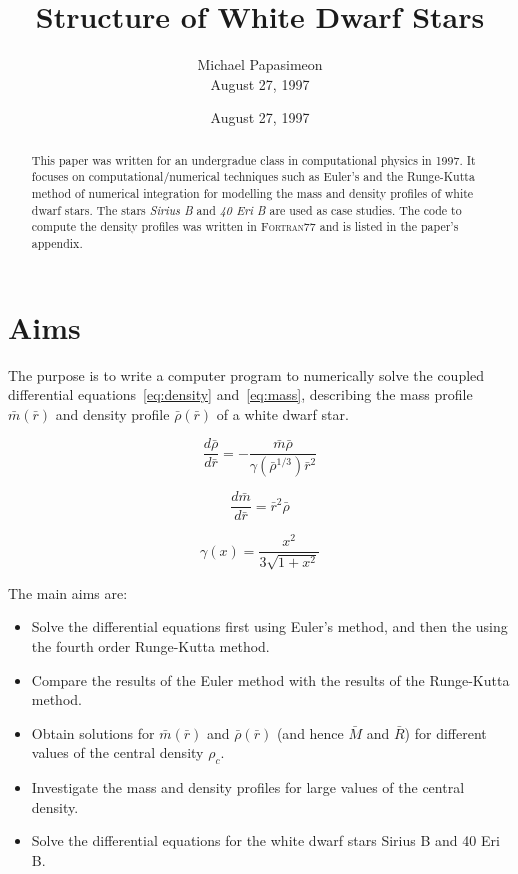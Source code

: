 \documentclass[a4paper]{IEEEtran}
\title{Structure of White Dwarf Stars}
\author{Michael Papasimeon\\ August 27, 1997}
\date{August 27, 1997}
\newcommand{\R}{\bar{r}}
\newcommand{\M}{\bar{m}}
\newcommand{\Rho}{\bar{\rho}}
\begin{document}
\maketitle

\begin{abstract}
This paper was written for an undergradue class in computational physics in 1997. 
It focuses on computational/numerical techniques such as Euler's and the Runge-Kutta 
method of numerical integration for modelling the mass and density profiles of white 
dwarf stars. The stars \emph{Sirius B} and \emph{40 Eri B} are used as case studies. 
The code to compute the density profiles was written in \textsc{Fortran77} and is listed 
in the paper's appendix. 
\end{abstract} 


\section{Aims}
    The purpose is to write a computer program to numerically
    solve the coupled differential equations~\ref{eq:density}
    and~\ref{eq:mass}, describing the mass profile $\M(\R)$ and density
    profile $\Rho(\R)$ of a white dwarf star.

    \begin{equation}
        \frac{d\Rho}{d\R} = - \frac{\M\Rho}{\gamma(\Rho^{1/3})\R^2}
        \label{eq:density}
    \end{equation}

    \begin{equation}
        \frac{d\M}{d\R} = \R^2\Rho
        \label{eq:mass}
    \end{equation}

    \begin{equation}
        \gamma(x) = \frac{x^2}{3\sqrt{1 + x^2}}
    \end{equation}

    The main aims are:
    \begin{itemize}
        \item Solve the differential equations first using Euler's
              method, and then the using the fourth order Runge-Kutta
              method.
        \item Compare the results of the Euler method with the results
              of the Runge-Kutta method.
        \item Obtain solutions for $\M(\R)$ and $\Rho(\R)$ (and hence 
              $\bar{M}$ and $\bar{R}$)
              for different values of the central density $\rho_c$.
        \item Investigate the mass and density profiles for large
              values of the central density.
        \item Solve the differential equations for the white dwarf stars
              Sirius B and 40 Eri B. 
    \end{itemize}
\end{document}
